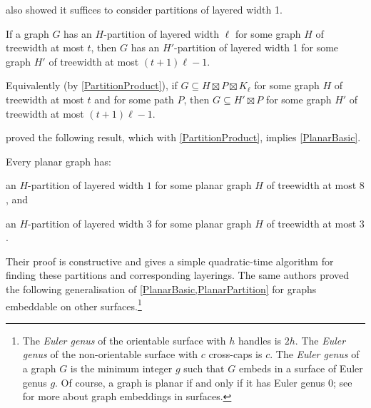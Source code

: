 \documentclass{patmorin}
\begin{document}
\citet{dujmovic.joret.ea:planar} also showed it suffices to consider partitions of layered width 1.

\begin{lem} 
\label{MakeWidth1}
If a graph $G$ has an $H$-partition of layered width $\ell$ for some graph $H$ of treewidth at most $t$, then $G$ has an $H'$-partition of layered width 1 for some graph $H'$ of treewidth at most $(t+1)\ell-1$.  

Equivalently (by \cref{PartitionProduct}), if $G\subseteq H\boxtimes P\boxtimes K_\ell$ for some graph $H$ of treewidth at most $t$  and for some path $P$, then $G\subseteq H' \boxtimes P$ for some graph $H'$ of treewidth at most $(t+1)\ell-1$.
\end{lem}

\citet{dujmovic.joret.ea:planar} proved the following result, which with \cref{PartitionProduct}, implies \cref{PlanarBasic}. 

\begin{thm}
\label{PlanarPartition}
Every planar graph has:
\begin{compactenum}[(a)]
\item an $H$-partition of layered width $1$ for some planar graph $H$ of treewidth at most $8$, and
\item an $H$-partition of layered width $3$ for some planar graph $H$ of treewidth at most $3$.
\end{compactenum}
\end{thm}
Their proof is constructive and gives a simple quadratic-time algorithm for finding these partitions and corresponding layerings.
%
%
The same authors proved the following generalisation of \cref{PlanarBasic,PlanarPartition} for graphs embeddable on other surfaces.\footnote{The \textit{Euler genus} of the orientable surface with $h$ handles is $2h$. The \textit{Euler genus} of the non-orientable surface with $c$ cross-caps is $c$. The \textit{Euler genus} of a graph $G$ is the minimum integer $g$ such that $G$ embeds in a surface of Euler genus $g$. Of course, a graph is planar if and only if it has Euler genus 0; see \citep{mohar.thomassen:graphs} for more about graph embeddings in surfaces.}
\end{document}
